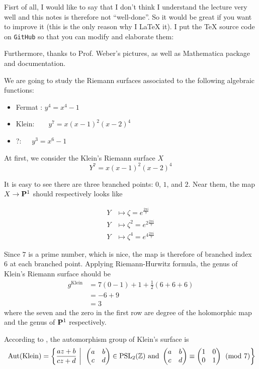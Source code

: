 Fisrt of all, I would like to say that I don't think I understand the lecture very well and this notes is therefore not ``well-done''. So it would be great if you want to improve it (this is the only reason why I \LaTeX{} it). I put the \TeX{} source code on \texttt{GitHub} so that you can modify and elaborate them:

Furthermore, thanks to Prof. Weber's pictures, as well as Mathematica package and documentation.\\
\par


We are going to study the Riemann surfaces associated to the following algebraic functions:
\begin{itemize}
    \item Fermat : $y^4=x^4-1$
    \item Klein:\ \  \ \  $y^7=x(x-1)^2(x-2)^4$
    \item ?:\ \ \   \quad \quad   $y^3=x^6-1$
\end{itemize}

At first, we consider the Klein's Riemann surface $X$
$$Y^7=x(x-1)^2(x-2)^4$$

It is easy to see there are three branched points: $0$, $1$, and $2$. Near them, the map $X\rightarrow \mathbf{P}^{1}$ should respectively looks like 

\[\begin{aligned}
    Y & \mapsto \zeta = e^{\frac{2\pi i}{7}}\\
    Y & \mapsto \zeta^{2} = e^{2\frac{2\pi i}{7}}\\
    Y & \mapsto \zeta^{4} = e^{4\frac{2\pi i}{7}}
\end{aligned}\]

Since $7$ is a prime number, which is nice, the map is therefore of branched index $6$ at each branched point. Applying Riemann-Hurwitz formula, the genus of Klein's Riemann surface should be 
\[\begin{aligned}
g^{\mathrm{Klein}}&=7(0-1)+1+\frac{1}{2}(6+6+6)\\
&=-6+9\\
&=3
\end{aligned}\]
where the seven and the zero in the first row are degree of the holomorphic map and the genus of $\mathbf{P}^1$ respectively. \par

According to \cite{MR1722412}, the automorphism group of Klein's surface is 
\[\Aut(\mathrm{Klein})=\left\{\frac{az+b}{cz+d}~~\bigg|\,\ \begin{pmatrix}a&b\\c&d\end{pmatrix}\in \mathrm{PSL}_2(\Z) \text{~~and ~~}\begin{pmatrix}a&b\\c&d\end{pmatrix}\equiv \begin{pmatrix}1&0\\0&1\end{pmatrix} \pmod{7}\right\}\]


